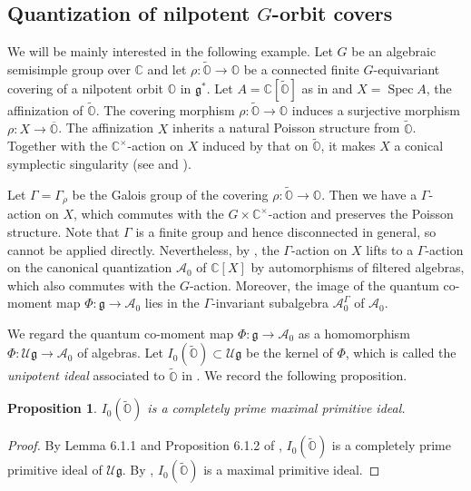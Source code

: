 \documentclass[11pt, a4paper]{amsart}
\newcommand{\C}{\mathbb{C}}
\newcommand{\g}{\mathfrak{g}}
\newcommand{\orb}{\mathbb{O}}
\newcommand{\fg}{\mathfrak{g}}
\newcommand{\cA}{\mathcal{A}}
\newcommand{\cU}{\mathcal{U}}
\newcommand{\Ug}{\cU\fg}
\newcommand{\cm}{\C^\times}
\newcommand{\spec}{\operatorname{Spec}}
\newtheorem{Prop}[Thm]{Proposition}
\theoremstyle{definition}
\numberwithin{equation}{section}
\begin{document}
\subsection{Quantization of nilpotent $G$-orbit covers}
\label{subsec:quant_G_orbit_covers}

We will be mainly interested in the following example. Let $G$ be an algebraic semisimple group over $\C$ and let $\rho: \widetilde{\orb} \to \orb$ be a connected finite $G$-equivariant covering of a nilpotent orbit $\orb$ in $\g^*$. Let $A=\C[\widetilde{\orb}]$ as in  and $X = \spec A$, the affinization of $\widetilde{\orb}$. The covering morphism $\rho: \widetilde{\orb} \to \orb$ induces a surjective morphism $\rho: X \to \overline{\orb}$. The affinization $X$ inherits a natural Poisson structure from $\widetilde{\orb}$. Together with the $\cm$-action on $X$ induced by that on $\widetilde{\orb}$, it makes $X$ a conical symplectic singularity (see \cite[Lemma 2.5]{Losev:HC_bimodules} and \cite[\S P.3]{Namikawa:covers}). 

Let $\Gamma = \Gamma_{\rho}$ be the Galois group of the covering $\rho: \widetilde{\orb} \to \orb$. Then we have a $\Gamma$-action on $X$, which commutes with the $G \times \cm$-action and preserves the Poisson structure. Note that $\Gamma$ is a finite group and hence disconnected in general, so  cannot be applied directly. Nevertheless, by \cite[Proposition 5.1.1]{LMBM}, the $\Gamma$-action on $X$ lifts to a $\Gamma$-action on the canonical quantization $\cA_0$ of $\C[X]$ by automorphisms of filtered algebras, which also commutes with the $G$-action. Moreover, the image of the quantum co-moment map $\Phi: \g \to \cA_0$ lies in the $\Gamma$-invariant subalgebra $\cA_0^\Gamma$ of $\cA_0$.

We regard the quantum co-moment map $\Phi: \g \to \cA_0$ as a homomorphism $\Phi: \Ug \to \cA_0$ of algebras. Let $I_0(\widetilde{\orb}) \subset \Ug$ be the kernel of $\Phi$, which is called the \emph{unipotent ideal} associated to $\widetilde{\orb}$ in \cite{LMBM}. 
We record the following proposition.

\begin{Prop} \label{prop:unip_ideal_prim}
	$I_0(\widetilde{\orb})$ is a completely prime maximal primitive ideal.
\end{Prop}

\begin{proof}
	By Lemma 6.1.1 and Proposition 6.1.2 of \cite{LMBM}, $I_0(\widetilde{\orb})$ is a completely prime primitive ideal of $\Ug$. By \cite[Theorem 5.0.1]{MBM}, $I_0(\widetilde{\orb})$ is a maximal primitive ideal.
\end{proof}
\end{document}
